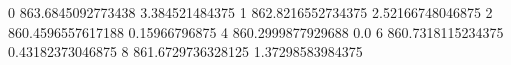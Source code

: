 0 863.6845092773438 3.384521484375
1 862.8216552734375 2.52166748046875
2 860.4596557617188 0.15966796875
4 860.2999877929688 0.0
6 860.7318115234375 0.43182373046875
8 861.6729736328125 1.37298583984375
